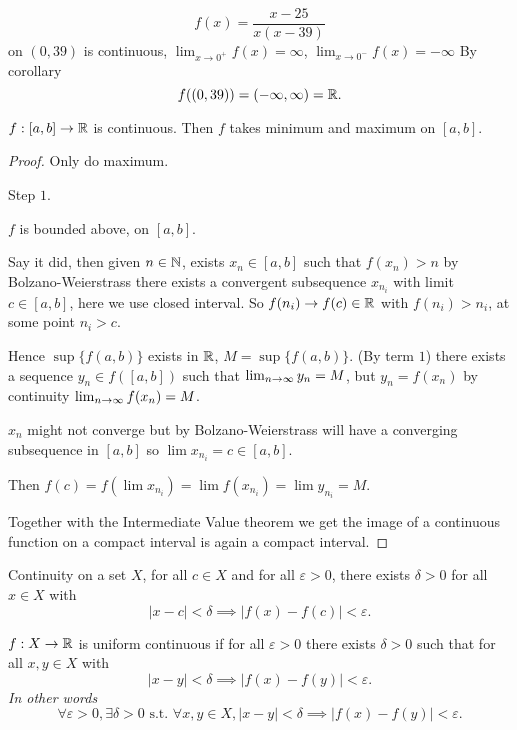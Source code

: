 \documentclass[10pt, a4paper]{article}
\begin{document}
\begin{example}
    \[
    f(x) = \frac{x - 25}{x(x - 39)}
    \]
    on $(0, 39)$ is continuous,
    $\lim_{x \to 0 ^ {+}}f(x) = \infty$,
    $\lim_{x \to 0 ^ {-}}f(x) = -\infty$
    By corollary
    \[
    f((0, 39)) = (-\infty, \infty) = \mathbb{R}.
    \]
\end{example}

\begin{theorem}
    $f : [a, b] \to \mathbb{R}$ is continuous.
    Then $f$ takes minimum and maximum on $[a, b]$.
    
    \begin{proof}
        Only do maximum.

        Step $1$.
        
        $f$ is bounded above,
        on $[a, b]$.

        Say it did,
        then given $n \in \mathbb{N}$,
        exists $x_n \in [a, b]$ such that $f(x_n) > n$ by Bolzano-Weierstrass there exists a convergent subsequence $x_{n_i}$ with limit $c \in [a, b]$,
        here we use closed interval.
        So $f(n_i) \to f(c) \in \mathbb{R}$ with $f(n_i) > n_i$,
        at some point $n_i > c$.

        Hence $\sup\{f(a, b)\}$ exists in $\mathbb{R}$,
        $M = \sup\{f(a, b)\}$.
        (By term $1$)
        there exists a sequence $y_n \in f([a, b])$ such that $\lim_{n \rightarrow \infty} y_n = M$,
        but $y_n = f(x_n)$ by continuity $\lim_{n \rightarrow \infty} f(x_n) = M$.

        $x_n$ might not converge but by Bolzano-Weierstrass will have a converging subsequence in $[a, b]$ so $\lim x_{n_i} = c \in [a, b]$.

        Then $f(c) = f(\lim x_{n_i}) = \lim f(x_{n_i}) = \lim y_{n_i} = M$.

        Together with the Intermediate Value theorem we get the image of a continuous function on a compact interval is again a compact interval.
    \end{proof}
\end{theorem}

\begin{definition}
    Continuity on a set $X$,
    for all $c \in X$ and for all $\varepsilon > 0$,
    there exists $\delta > 0$ for all $x \in X$ with
    \[
    |x - c| < \delta \implies |f(x) - f(c)| < \varepsilon.
    \]
\end{definition}

\begin{definition}
    $f : X \to \mathbb{R}$ is uniform continuous if for all $\varepsilon > 0$ there exists $\delta > 0$ such that for all $x, y \in X$ with
    \[
    |x - y| < \delta \implies |f(x) - f(y)| < \varepsilon.
    \]
    \textit{In other words}
    \[
    \forall \varepsilon > 0, \exists \delta > 0 \text{ s.t. } \forall x, y \in X, |x - y| < \delta \implies |f(x) - f(y)| < \varepsilon.
    \]
\end{definition}
\end{document}
